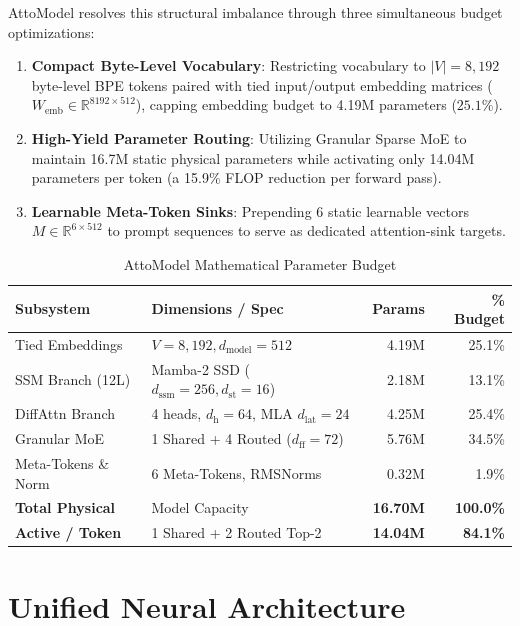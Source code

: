 \documentclass[10pt,twocolumn,letterpaper]{article}
\begin{document}
AttoModel resolves this structural imbalance through three simultaneous budget optimizations:
\begin{enumerate}
    \item \textbf{Compact Byte-Level Vocabulary}: Restricting vocabulary to $|V| = 8,192$ byte-level BPE tokens paired with tied input/output embedding matrices ($W_{\text{emb}} \in \mathbb{R}^{8192 \times 512}$), capping embedding budget to 4.19M parameters ($25.1\%$).
    \item \textbf{High-Yield Parameter Routing}: Utilizing Granular Sparse MoE to maintain 16.7M static physical parameters while activating only 14.04M parameters per token (a 15.9\% FLOP reduction per forward pass).
    \item \textbf{Learnable Meta-Token Sinks}: Prepending 6 static learnable vectors $M \in \mathbb{R}^{6 \times 512}$ to prompt sequences to serve as dedicated attention-sink targets.
\end{enumerate}

\begin{table}[h]
\centering
\small
\caption{AttoModel Mathematical Parameter Budget}
\label{tab:parameter_budget}
\begin{tabular}{@{}llrr@{}}
\toprule
\textbf{Subsystem} & \textbf{Dimensions / Spec} & \textbf{Params} & \textbf{\% Budget} \\
\midrule
Tied Embeddings & $V=8,192, d_{\text{model}}=512$ & 4.19M & 25.1\% \\
SSM Branch (12L) & Mamba-2 SSD ($d_{\text{ssm}}=256, d_{\text{st}}=16$) & 2.18M & 13.1\% \\
DiffAttn Branch & 4 heads, $d_{\text{h}}=64$, MLA $d_{\text{lat}}=24$ & 4.25M & 25.4\% \\
Granular MoE & 1 Shared + 4 Routed ($d_{\text{ff}}=72$) & 5.76M & 34.5\% \\
Meta-Tokens \& Norm & 6 Meta-Tokens, RMSNorms & 0.32M & 1.9\% \\
\midrule
\textbf{Total Physical} & Model Capacity & \textbf{16.70M} & \textbf{100.0\%} \\
\textbf{Active / Token} & 1 Shared + 2 Routed Top-2 & \textbf{14.04M} & \textbf{84.1\%} \\
\bottomrule
\end{tabular}
\end{table}

\section{Unified Neural Architecture}
\end{document}
